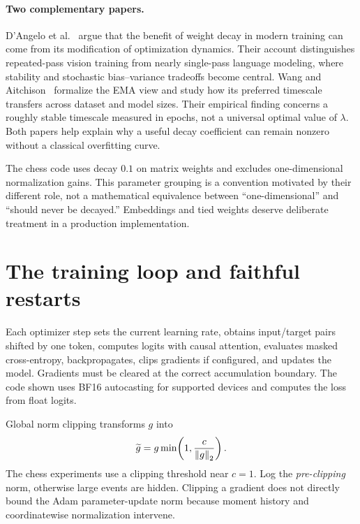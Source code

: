 \paragraph{Two complementary papers.}
D'Angelo et al.~\cite{whywd} argue that the benefit of weight decay in modern training can come from its modification of optimization dynamics. Their account distinguishes repeated-pass vision training from nearly single-pass language modeling, where stability and stochastic bias--variance tradeoffs become central. Wang and Aitchison~\cite{wdscale} formalize the EMA view and study how its preferred timescale transfers across dataset and model sizes. Their empirical finding concerns a roughly stable timescale measured in epochs, not a universal optimal value of $\lambda$. Both papers help explain why a useful decay coefficient can remain nonzero without a classical overfitting curve.


The chess code uses decay $0.1$ on matrix weights and excludes one-dimensional normalization gains. This parameter grouping is a convention motivated by their different role, not a mathematical equivalence between ``one-dimensional'' and ``should never be decayed.'' Embeddings and tied weights deserve deliberate treatment in a production implementation.

\section{The training loop and faithful restarts}
Each optimizer step sets the current learning rate, obtains input/target pairs shifted by one token, computes logits with causal attention, evaluates masked cross-entropy, backpropagates, clips gradients if configured, and updates the model. Gradients must be cleared at the correct accumulation boundary. The code shown uses BF16 autocasting for supported devices and computes the loss from float logits.

Global norm clipping transforms $g$ into
\begin{equation}
 \widetilde g=g\min\!\left(1,\frac{c}{\left\lVert g\right\rVert_2}\right).
\end{equation}
The chess experiments use a clipping threshold near $c=1$. Log the \emph{pre-clipping} norm, otherwise large events are hidden. Clipping a gradient does not directly bound the Adam parameter-update norm because moment history and coordinatewise normalization intervene.

